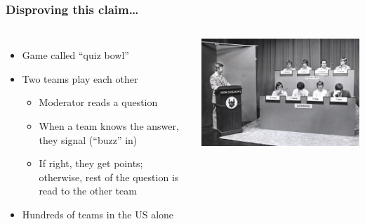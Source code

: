 \documentclass[xcolor=dvipsnames]{beamer}
\begin{document}
\begin{frame}
	\frametitle{Disproving this claim\dots}
	\begin{columns}

	\begin{itemize}
		\item Game called ``quiz bowl''
		\item Two teams play each other
		\begin{itemize}
			\item Moderator reads a question
			\item When a team knows the answer, they signal (``buzz'' in)
			\item If right, they get points; otherwise, rest of the question is read to the other team
		\end{itemize}
	      \item Hundreds of teams in the US alone
	\end{itemize}

	\includegraphics{qb/quizbowl}

	\end{columns}

\end{frame}
\end{document}
